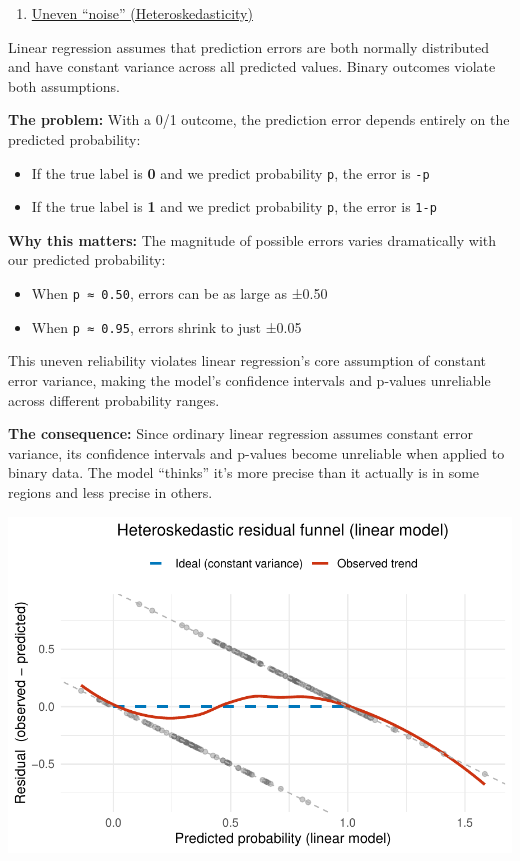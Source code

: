 \documentclass[
  letterpaper,
  DIV=11,
  numbers=noendperiod]{scrartcl}
\providecommand{\tightlist}{%
  \setlength{\itemsep}{0pt}\setlength{\parskip}{0pt}}\usepackage{longtable,booktabs,array}
\begin{document}
\begin{enumerate}
\def\labelenumi{\arabic{enumi}.}
\setcounter{enumi}{1}
\tightlist
\item
  \ul{Uneven ``noise'' (Heteroskedasticity)}
\end{enumerate}

Linear regression assumes that prediction errors are both normally
distributed and have constant variance across all predicted values.
Binary outcomes violate both assumptions.

\textbf{The problem:} With a 0/1 outcome, the prediction error depends
entirely on the predicted probability:

\begin{itemize}
\tightlist
\item
  If the true label is \textbf{0} and we predict probability \texttt{p},
  the error is \texttt{-p}
\item
  If the true label is \textbf{1} and we predict probability \texttt{p},
  the error is \texttt{1-p}
\end{itemize}

\textbf{Why this matters:} The magnitude of possible errors varies
dramatically with our predicted probability:

\begin{itemize}
\tightlist
\item
  When \texttt{p\ ≈\ 0.50}, errors can be as large as ±0.50
\item
  When \texttt{p\ ≈\ 0.95}, errors shrink to just ±0.05
\end{itemize}

This uneven reliability violates linear regression's core assumption of
constant error variance, making the model's confidence intervals and
p-values unreliable across different probability ranges.

\textbf{The consequence:} Since ordinary linear regression assumes
constant error variance, its confidence intervals and p-values become
unreliable when applied to binary data. The model ``thinks'' it's more
precise than it actually is in some regions and less precise in others.

\begin{center}
\includegraphics[width=0.8\linewidth,height=\textheight,keepaspectratio]{Beyond!!!_files/figure-pdf/unnamed-chunk-3-1.pdf}
\end{center}
\end{document}
